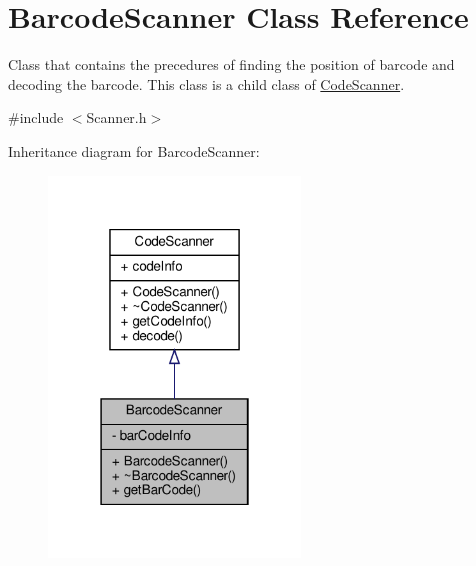 \hypertarget{class_barcode_scanner}{}\section{Barcode\+Scanner Class Reference}
\label{class_barcode_scanner}


Class that contains the precedures of finding the position of barcode and decoding the barcode. This class is a child class of \hyperlink{class_code_scanner}{Code\+Scanner}.  




{\ttfamily \#include $<$Scanner.\+h$>$}



Inheritance diagram for Barcode\+Scanner\+:
\nopagebreak
\begin{figure}[H]
\begin{center}
\leavevmode
\includegraphics[width=190pt]{class_barcode_scanner__inherit__graph}
\end{center}
\end{figure}


